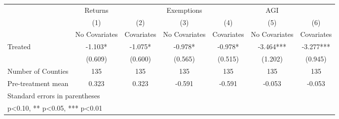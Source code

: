 {
\def\sym#1{\ifmmode^{#1}\else\(^{#1}\)\fi}
\begin{tabular}{l*{6}{c}}
\hline\hline
            &     Returns   &               &  Exemptions   &               &         AGI   &               \\
            &\multicolumn{1}{c}{(1)}&\multicolumn{1}{c}{(2)}&\multicolumn{1}{c}{(3)}&\multicolumn{1}{c}{(4)}&\multicolumn{1}{c}{(5)}&\multicolumn{1}{c}{(6)}\\
            &\multicolumn{1}{c}{No Covariates}&\multicolumn{1}{c}{Covariates}&\multicolumn{1}{c}{No Covariates}&\multicolumn{1}{c}{Covariates}&\multicolumn{1}{c}{No Covariates}&\multicolumn{1}{c}{Covariates}\\
\hline
Treated     &      -1.103*  &      -1.075*  &      -0.978*  &      -0.978*  &      -3.464***&      -3.277***\\
            &     (0.609)   &     (0.600)   &     (0.565)   &     (0.515)   &     (1.202)   &     (0.945)   \\
\hline
Number of Counties&         135   &         135   &         135   &         135   &         135   &         135   \\
Pre-treatment mean&       0.323   &       0.323   &      -0.591   &      -0.591   &      -0.053   &      -0.053   \\
\hline\hline
\multicolumn{7}{l}{\footnotesize Standard errors in parentheses}\\
\multicolumn{7}{l}{\footnotesize * p<0.10, ** p<0.05, *** p<0.01}\\
\end{tabular}
}
